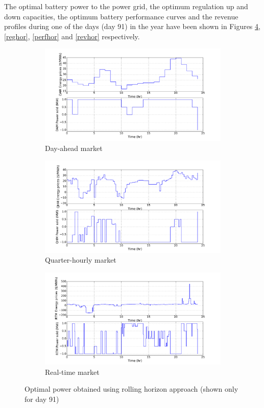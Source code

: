 \documentclass[11pt,twoside]{article}
\begin{document}
The optimal battery power to the power grid, the optimum regulation up and down capacities, the optimum battery performance curves and the revenue profiles during one of the days (day 91) in the year have been shown in Figures \ref{phor}, \ref{reghor}, \ref{perfhor} and \ref{revhor} respectively.
\begin{figure}[h!tp]
\centering
\begin{subfigure}[b]{0.49\textwidth} \includegraphics[width=\textwidth]{Figures/Plots/Horizon/DAM_P.pdf} \caption{Day-ahead market}\label{damphor} \end{subfigure} \hfill
\begin{subfigure}[b]{0.49\textwidth} \includegraphics[width=\textwidth]{Figures/Plots/Horizon/QHM_P.pdf} \caption{Quarter-hourly market}\label{qhmphor} \end{subfigure} \hfill
\begin{subfigure}[b]{0.49\textwidth} \includegraphics[width=\textwidth]{Figures/Plots/Horizon/RTM_P.pdf} \caption{Real-time market}\label{rtmphor}\end{subfigure} \hfill
\caption{Optimal power obtained using rolling horizon approach (shown only for day 91)}\label{phor}
\end{figure}
\end{document}
